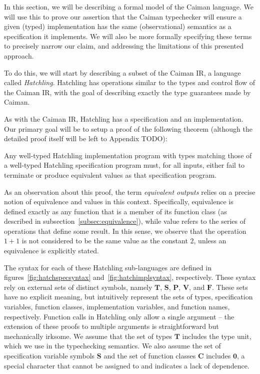 
In this section, we will be describing a formal model of the Caiman language. We will use this to prove our assertion that the Caiman typechecker will ensure a given (typed) implementation has the same (observational) semantics as a specification it implements.  We will also be more formally specifying these terms to precisely narrow our claim, and addressing the limitations of this presented approach.

To do this, we will start by describing a subset of the Caiman IR, a language called \textit{Hatchling}.  Hatchling has operations similar to the types and control flow of the Caiman IR, with the goal of describing exactly the type guarantees made by Caiman.

As with the Caiman IR, Hatchling has a specification and an implementation.    Our primary goal will be to setup a proof of the following theorem (although the detailed proof itself will be left to Appendix TODO):
%
\begin{theorem}
Any well-typed Hatchling implementation program with types matching those of a well-typed Hatchling specification program must, for all inputs, either fail to terminate or produce equivalent values as that specification program.
\end{theorem}
%
As an observation about this proof, the term \textit{equivalent outputs} relies on a precise notion of equivalence and values in this context.  Specifically, equivalence is defined exactly as any function that is a member of its function class (as described in subsection~\ref{subsec:equivalence}), while value refers to the series of operations that define some result.  In this sense, we observe that the operation $1+1$ is not considered to be the same value as the constant $2$, unless an equivalence is explicitly stated.

The syntax for each of these Hatchling sub-languages are defined in figures~\ref{fig:hatchspecsyntax} and~\ref{fig:hatchimplsyntax}, respectively.  These syntax rely on external sets of distinct symbols, namely $\mathbf{T}$, $\textbf{S}$, $\textbf{P}$, $\mathbf{V}$, and $\mathbf{F}$.  These sets have no explicit meaning, but intuitively represent the sets of types, specification variables, function classes, implementation variables, and function names, respectively.  Function calls in Hatchling only allow a single argument -- the extension of these proofs to multiple arguments is straightforward but mechanically irksome.  We assume that the set of types $\mathbf{T}$ includes the type $\textrm{unit}$, which we use in the typechecking semantics.  We also assume the set of specification variable symbols $\mathbf{S}$ and the set of function classes $\mathbf{C}$ includes $\mathbf{0}$, a special character that cannot be assigned to and indicates a lack of dependence.

